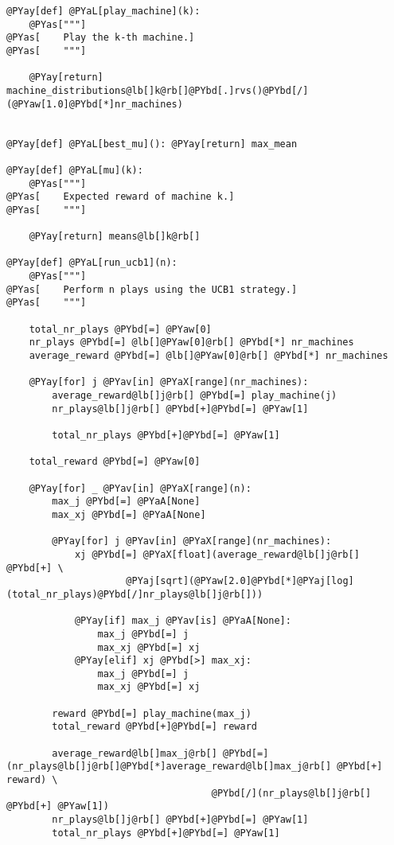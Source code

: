 \begin{Verbatim}[commandchars=@\[\]]
@PYay[def] @PYaL[play_machine](k):
    @PYas["""]
@PYas[    Play the k-th machine.]
@PYas[    """]
    
    @PYay[return] machine_distributions@lb[]k@rb[]@PYbd[.]rvs()@PYbd[/](@PYaw[1.0]@PYbd[*]nr_machines)


@PYay[def] @PYaL[best_mu](): @PYay[return] max_mean
    
@PYay[def] @PYaL[mu](k):
    @PYas["""]
@PYas[    Expected reward of machine k.]
@PYas[    """]
    
    @PYay[return] means@lb[]k@rb[]    

@PYay[def] @PYaL[run_ucb1](n):
    @PYas["""]
@PYas[    Perform n plays using the UCB1 strategy.]
@PYas[    """]
          
    total_nr_plays @PYbd[=] @PYaw[0]
    nr_plays @PYbd[=] @lb[]@PYaw[0]@rb[] @PYbd[*] nr_machines
    average_reward @PYbd[=] @lb[]@PYaw[0]@rb[] @PYbd[*] nr_machines
    
    @PYay[for] j @PYav[in] @PYaX[range](nr_machines):
        average_reward@lb[]j@rb[] @PYbd[=] play_machine(j)
        nr_plays@lb[]j@rb[] @PYbd[+]@PYbd[=] @PYaw[1]
        
        total_nr_plays @PYbd[+]@PYbd[=] @PYaw[1]
    
    total_reward @PYbd[=] @PYaw[0]
    
    @PYay[for] _ @PYav[in] @PYaX[range](n):
        max_j @PYbd[=] @PYaA[None]
        max_xj @PYbd[=] @PYaA[None]
        
        @PYay[for] j @PYav[in] @PYaX[range](nr_machines):
            xj @PYbd[=] @PYaX[float](average_reward@lb[]j@rb[] @PYbd[+] \
                     @PYaj[sqrt](@PYaw[2.0]@PYbd[*]@PYaj[log](total_nr_plays)@PYbd[/]nr_plays@lb[]j@rb[]))
            
            @PYay[if] max_j @PYav[is] @PYaA[None]:
                max_j @PYbd[=] j
                max_xj @PYbd[=] xj
            @PYay[elif] xj @PYbd[>] max_xj:                    
                max_j @PYbd[=] j
                max_xj @PYbd[=] xj
    
        reward @PYbd[=] play_machine(max_j)
        total_reward @PYbd[+]@PYbd[=] reward
        
        average_reward@lb[]max_j@rb[] @PYbd[=] (nr_plays@lb[]j@rb[]@PYbd[*]average_reward@lb[]max_j@rb[] @PYbd[+] reward) \
                                    @PYbd[/](nr_plays@lb[]j@rb[] @PYbd[+] @PYaw[1])
        nr_plays@lb[]j@rb[] @PYbd[+]@PYbd[=] @PYaw[1]
        total_nr_plays @PYbd[+]@PYbd[=] @PYaw[1]
        

\end{Verbatim}
